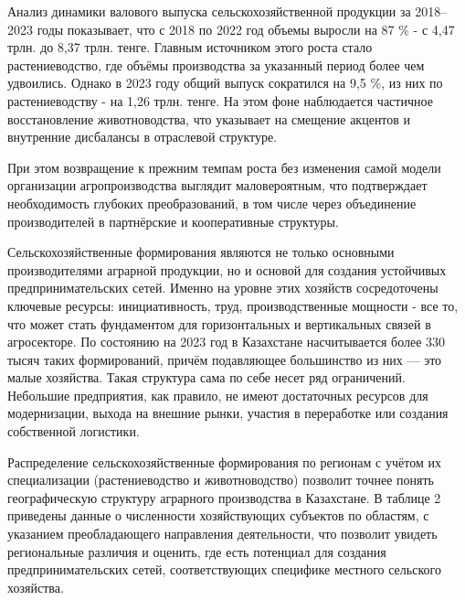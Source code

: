 \begin{multicols}{2}
Анализ динамики валового выпуска сельскохозяйственной продукции за
2018--2023 годы показывает, что с 2018 по 2022 год объемы выросли на 87
\% - с 4,47 трлн. до 8,37 трлн. тенге. Главным источником этого роста
стало растениеводство, где объёмы производства за указанный период более
чем удвоились. Однако в 2023 году общий выпуск сократился на 9,5 \%, из
них по растениеводству - на 1,26 трлн. тенге. На этом фоне наблюдается
частичное восстановление животноводства, что указывает на смещение
акцентов и внутренние дисбалансы в отраслевой структуре.

При этом возвращение к прежним темпам роста без изменения самой модели
организации агропроизводства выглядит маловероятным, что подтверждает
необходимость глубоких преобразований, в том числе через объединение
производителей в партнёрские и кооперативные структуры.

Сельскохозяйственные формирования являются не только основными
производителями аграрной продукции, но и основой для создания устойчивых
предпринимательских сетей. Именно на уровне этих хозяйств сосредоточены
ключевые ресурсы: инициативность, труд, производственные мощности - все
то, что может стать фундаментом для горизонтальных и вертикальных связей
в агросекторе. По состоянию на 2023 год в Казахстане насчитывается более
330 тысяч таких формирований, причём подавляющее большинство из них ---
это малые хозяйства. Такая структура сама по себе несет ряд ограничений.
Небольшие предприятия, как правило, не имеют достаточных ресурсов для
модернизации, выхода на внешние рынки, участия в переработке или
создания собственной логистики.

Распределение сельскохозяйственные формирования по регионам с учётом их
специализации (растениеводство и животноводство) позволит точнее понять
географическую структуру аграрного производства в Казахстане. В таблице
2 приведены данные о численности хозяйствующих субъектов по областям, с
указанием преобладающего направления деятельности, что позволит увидеть
региональные различия и оценить, где есть потенциал для создания
предпринимательских сетей, соответствующих специфике местного сельского
хозяйства.
\end{multicols}

